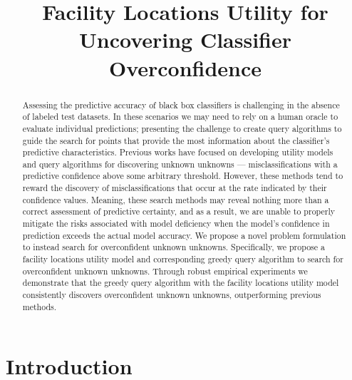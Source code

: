 \documentclass[conference]{IEEEtran}
\begin{document}
\title{Facility Locations Utility for Uncovering Classifier Overconfidence}

\author{
\and
{}
}

\maketitle

\begin{abstract}
Assessing the predictive accuracy of black box classifiers is challenging in the absence of labeled test datasets. In these scenarios we may need to rely on a human oracle to evaluate individual predictions; presenting the challenge to create query algorithms to guide the search for points that provide the most information about the classifier's predictive characteristics. Previous works have focused on developing utility models and query algorithms for discovering unknown unknowns --- misclassifications with a predictive confidence above some arbitrary threshold. However, these methods tend to reward the discovery of misclassifications that occur at the rate indicated by their confidence values.  Meaning, these search methods may reveal nothing more than a correct assessment of predictive certainty, and as a result, we are unable to properly mitigate the risks associated with model deficiency when the model's confidence in prediction exceeds the actual model accuracy. We propose a novel problem formulation to instead search for overconfident unknown unknowns. Specifically, we propose a facility locations utility model and corresponding greedy query algorithm to search for overconfident unknown unknowns. Through robust empirical experiments we demonstrate that the greedy query algorithm with the facility locations utility model consistently discovers overconfident unknown unknowns, outperforming previous methods. 
\end{abstract}


\section{Introduction}
\end{document}
